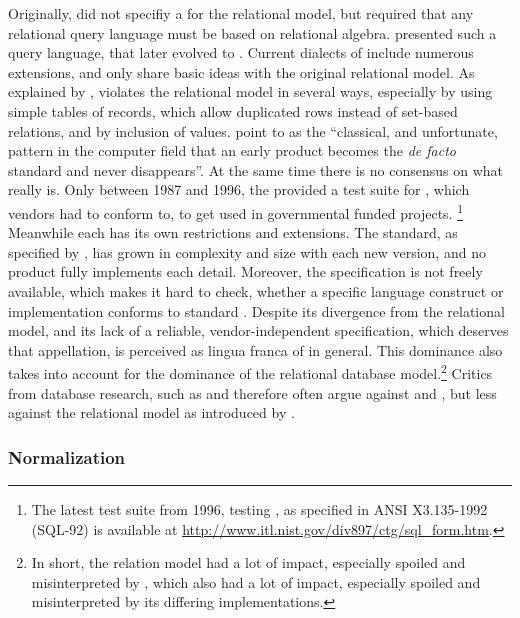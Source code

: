 Originally,  did not specifiy a 
for the relational model, but required that any relational query language must
be based on relational algebra. \textcite{Chamberlin1974} presented such a query 
language, that later evolved to . Current dialects of  
include numerous extensions, and only share basic ideas with the original
relational model. As explained by \textcite{Darwen1995},  violates
the relational model in several ways, especially by using simple tables of
records, which allow duplicated rows instead of set-based relations, and by 
inclusion of  values. \textcite{Atkinson1989} point to
 as the ``classical, and unfortunate, pattern in the computer field 
that an early product becomes the \emph{de facto} standard and never disappears''.
At the same time there is no consensus on what  really is.
Only between 1987 and 1996, the  provided a test suite for , which  
vendors had to conform to, to get used in governmental funded projects.%
\footnote{The latest test suite from 1996, testing , as specified
in ANSI X3.135-1992 (SQL-92) is available at %
\url{http://www.itl.nist.gov/div897/ctg/sql_form.htm}.}
Meanwhile each  has its own restrictions and extensions. 
The  standard, as specified by , has grown in complexity 
and size with each new version, and no product fully implements each detail.
Moreover, the specification is not freely available, which makes it hard to 
check, whether a specific language construct or implementation conforms to
standard . Despite its divergence from the relational model, and 
its lack of a reliable, vendor-independent specification, which deserves that 
appellation,  is perceived as lingua franca of  in 
general. This dominance also takes into account for the dominance of the 
relational database model.\footnote{In short, the relation model had a
lot of impact, especially spoiled and misinterpreted by
, which also had a lot of impact, especially spoiled and 
misinterpreted by its differing implementations.}
Critics from database research, such as \textcite{Stonebraker2007} and
\textcite{Darwen1995} therefore often argue against  and 
, but less against the relational model as introduced by 
.

\subsubsection{Normalization}

